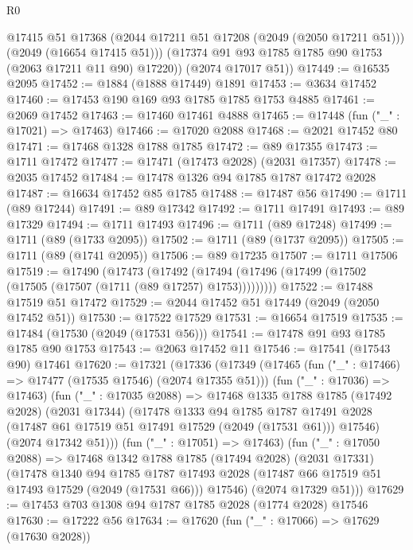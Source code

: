 \begin{lexlean}{R0}
\begin{coremodule}
          @17415
          @51
          @17368
          (@2044 @17211 @51 @17208 (@2049 (@2050 @17211 @51)))
          (@2049 (@16654 @17415 @51)))
        (@17374 @91 @93 @1785 @1785 @90 @1753 (@2063 @17211 @11 @90) @17220))
      (@2074 @17017 @51))
@17449 := @16535 @2095
@17452 := @1884 (@1888 @17449) @1891
@17453 := @3634 @17452
@17460 := @17453 @190 @169 @93 @1785 @1785 @1753 @4885
@17461 := @2069 @17452
@17463 := @17460 @17461 @4888
@17465 := @17448 (fun ("_" : @17021) => @17463)
@17466 := @17020 @2088
@17468 := @2021 @17452 @80
@17471 := @17468 @1328 @1788 @1785
@17472 := @89 @17355
@17473 := @1711 @17472
@17477 := @17471 (@17473 @2028) (@2031 @17357)
@17478 := @2035 @17452
@17484 := @17478 @1326 @94 @1785 @1787 @17472 @2028
@17487 := @16634 @17452 @85 @1785
@17488 := @17487 @56
@17490 := @1711 (@89 @17244)
@17491 := @89 @17342
@17492 := @1711 @17491
@17493 := @89 @17329
@17494 := @1711 @17493
@17496 := @1711 (@89 @17248)
@17499 := @1711 (@89 (@1733 @2095))
@17502 := @1711 (@89 (@1737 @2095))
@17505 := @1711 (@89 (@1741 @2095))
@17506 := @89 @17235
@17507 := @1711 @17506
@17519 := @17490
    (@17473
      (@17492 (@17494 (@17496 (@17499 (@17502 (@17505 (@17507 (@1711 (@89 @17257) @1753)))))))))
@17522 := @17488 @17519 @51 @17472
@17529 := @2044 @17452 @51 @17449 (@2049 (@2050 @17452 @51))
@17530 := @17522 @17529
@17531 := @16654 @17519
@17535 := @17484 (@17530 (@2049 (@17531 @56)))
@17541 := @17478 @91 @93 @1785 @1785 @90 @1753
@17543 := @2063 @17452 @11
@17546 := @17541 (@17543 @90) @17461
@17620 := @17321
    (@17336
      (@17349
        (@17465 (fun ("_" : @17466) => @17477 (@17535 @17546) (@2074 @17355 @51)))
        (fun ("_" : @17036) => @17463)
        (fun ("_" : @17035 @2088) =>
        @17468
          @1335
          @1788
          @1785
          (@17492 @2028)
          (@2031 @17344)
          (@17478
            @1333
            @94
            @1785
            @1787
            @17491
            @2028
            (@17487 @61 @17519 @51 @17491 @17529 (@2049 (@17531 @61)))
            @17546)
          (@2074 @17342 @51)))
      (fun ("_" : @17051) => @17463)
      (fun ("_" : @17050 @2088) =>
      @17468
        @1342
        @1788
        @1785
        (@17494 @2028)
        (@2031 @17331)
        (@17478
          @1340
          @94
          @1785
          @1787
          @17493
          @2028
          (@17487 @66 @17519 @51 @17493 @17529 (@2049 (@17531 @66)))
          @17546)
        (@2074 @17329 @51)))
@17629 := @17453 @703 @1308 @94 @1787 @1785 @2028 (@1774 @2028) @17546
@17630 := @17222 @56
@17634 := @17620 (fun ("_" : @17066) => @17629 (@17630 @2028))

\end{coremodule}
\end{lexlean}
